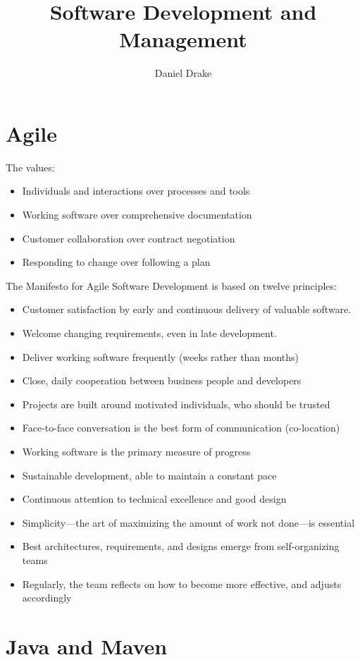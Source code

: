 \documentclass[12pt]{extarticle}
\title{Software Development and Management}
\author{Daniel Drake}
\theoremstyle{plain}
\theoremstyle{Definition}
\theoremstyle{Definition}
\theoremstyle{plain}
\begin{document}
	\maketitle				
	\section{Agile}
		The values:
		\begin{itemize}
			\item Individuals and interactions over processes and tools
			\item Working software over comprehensive documentation
			\item Customer collaboration over contract negotiation
			\item Responding to change over following a plan 
		\end{itemize}
		The Manifesto for Agile Software Development is based on twelve principles:
		\begin{itemize}
			\item Customer satisfaction by early and continuous delivery of valuable software.
			\item Welcome changing requirements, even in late development.
			\item Deliver working software frequently (weeks rather than months)
			\item Close, daily cooperation between business people and developers
			\item Projects are built around motivated individuals, who should be trusted
			\item Face-to-face conversation is the best form of communication (co-location)
			\item Working software is the primary measure of progress
			\item Sustainable development, able to maintain a constant pace
			\item Continuous attention to technical excellence and good design
			\item Simplicity—the art of maximizing the amount of work not done—is essential
			\item Best architectures, requirements, and designs emerge from self-organizing teams
			\item Regularly, the team reflects on how to become more effective, and adjusts accordingly
		\end{itemize}
	\newpage
	\section{Java and Maven}
	
\end{document}
